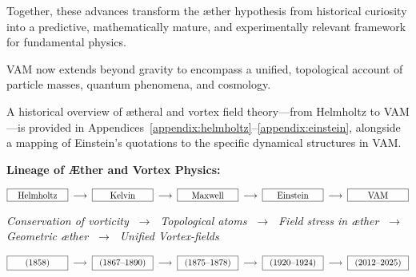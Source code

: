 Together, these advances transform the æther hypothesis from historical curiosity into a predictive, mathematically mature, and experimentally relevant framework for fundamental physics.

VAM now extends beyond gravity to encompass a unified, topological account of particle masses, quantum phenomena, and cosmology.

A historical overview of ætheral and vortex field theory—from Helmholtz to VAM—is provided in Appendices~\ref{appendix:helmholtz}–\ref{appendix:einstein}, alongside a mapping of Einstein’s quotations to the specific dynamical structures in VAM.

\vspace{1em}
\noindent\textbf{Lineage of Æther and Vortex Physics:}

\[\fbox{\makebox[2.2cm][c]{Helmholtz}} \;\longrightarrow\;\fbox{\makebox[2.2cm][c]{Kelvin}} \;\longrightarrow\;\fbox{\makebox[2.2cm][c]{Maxwell}} \;\longrightarrow\;\fbox{\makebox[2.2cm][c]{Einstein}} \;\longrightarrow\;\fbox{\makebox[2.2cm][c]{VAM}}\]

\begin{center}
\scriptsize
\textit{
Conservation of vorticity $\;\rightarrow\;$ Topological atoms $\;\rightarrow\;$ Field stress in æther $\;\rightarrow\;$ Geometric æther $\;\rightarrow\;$ Unified Vortex-fields
}
\end{center}
\[\fbox{\makebox[2.2cm][c]{(1858)}} \;\longrightarrow\;\fbox{\makebox[2.2cm][c]{(1867--1890)}} \;\longrightarrow\;\fbox{\makebox[2.2cm][c]{(1875--1878)}} \;\longrightarrow\;\fbox{\makebox[2.2cm][c]{(1920--1924)}} \;\longrightarrow\;\fbox{\makebox[2.2cm][c]{(2012--2025)}}\]

\vspace{1em}